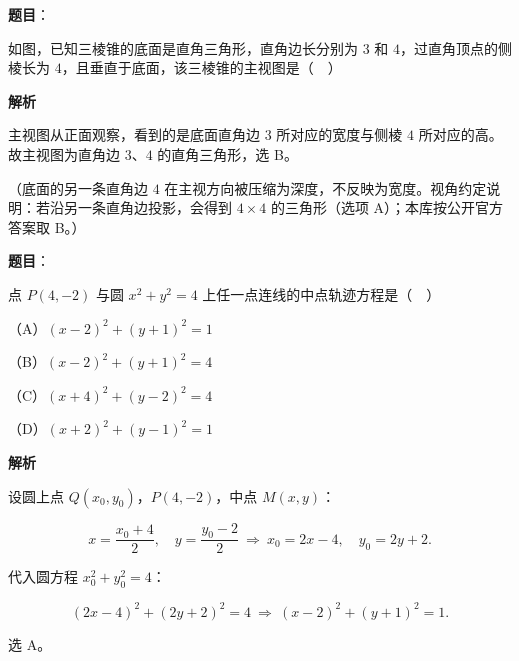 \begin{answer}

\textbf{题目}：

如图，已知三棱锥的底面是直角三角形，直角边长分别为 $3$ 和 $4$，过直角顶点的侧棱长为 $4$，且垂直于底面，该三棱锥的主视图是（　）
\nopagebreak[4]
\begin{center}\end{center}
\nopagebreak[4]
\textbf{解析}

主视图从正面观察，看到的是底面直角边 $3$ 所对应的宽度与侧棱 $4$ 所对应的高。故主视图为直角边 $3$、$4$ 的直角三角形，选 B。

（底面的另一条直角边 $4$ 在主视方向被压缩为深度，不反映为宽度。视角约定说明：若沿另一条直角边投影，会得到 $4\times4$ 的三角形（选项 A）；本库按公开官方答案取 B。）


\end{answer}
\begin{answer}

\textbf{题目}：

点 $P(4,-2)$ 与圆 $x^2+y^2=4$ 上任一点连线的中点轨迹方程是（　）

（A）$(x-2)^2+(y+1)^2=1$

（B）$(x-2)^2+(y+1)^2=4$

（C）$(x+4)^2+(y-2)^2=4$

（D）$(x+2)^2+(y-1)^2=1$

\textbf{解析}

设圆上点 $Q(x_0,y_0)$，$P(4,-2)$，中点 $M(x,y)$：

\nopagebreak[4]
\[x=\frac{x_0+4}{2},\quad y=\frac{y_0-2}{2}
\ \Longrightarrow\ x_0=2x-4,\quad y_0=2y+2 .\]

代入圆方程 $x_0^2+y_0^2=4$：

\nopagebreak[4]
\[(2x-4)^2+(2y+2)^2=4
\ \Longrightarrow\ (x-2)^2+(y+1)^2=1 .\]

选 A。


\end{answer}
